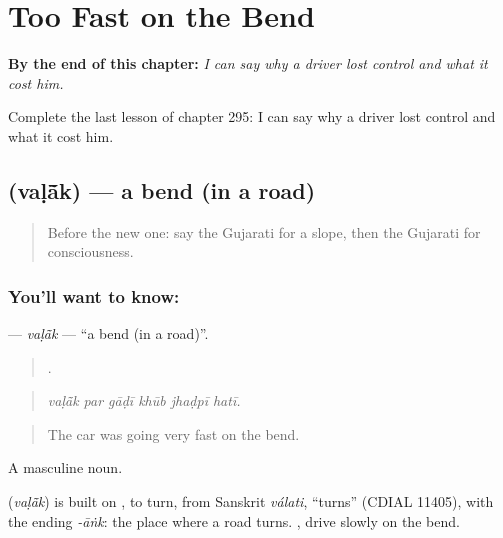 
\chapter{Too Fast on the Bend}
\label{ch:gu-too-fast-on-the-bend}

\begin{chapteropening}
\textbf{By the end of this chapter:} \emph{I can say why a driver lost control and what it cost him.}

Complete the last lesson of chapter 295: I can say why a driver lost control and what it cost him.
\end{chapteropening}

\section[\texorpdfstring{\gu{વળાંક} (vaḷā̃k)}{વળાંક (vaḷā̃k)}]{ (vaḷā̃k) — a bend (in a road)}

\label{lesson:GU-C295-valak}



\begin{quote}
Before the new one: say the Gujarati for a slope, then the Gujarati for consciousness.
\end{quote}

\subsection*{You'll want to know: }
\textbf{} — \emph{vaḷā̃k} — \textquotedblleft{}a bend (in a road)\textquotedblright{}.

\begin{quote}
     .
\end{quote}

\begin{quote}
\emph{vaḷā̃k par gāḍī khūb jhaḍpī hatī.}
\end{quote}

\begin{quote}
The car was going very fast on the bend.
\end{quote}

A masculine noun.

\begin{cousinweb}
\textbf{} (\emph{vaḷā̃k}) is built on \textbf{}, to turn, from Sanskrit \emph{válati}, \textquotedblleft{}turns\textquotedblright{} (CDIAL 11405), with the ending \emph{-āṅk}: the place where a road turns. \textbf{   }, drive slowly on the bend.
\end{cousinweb}

